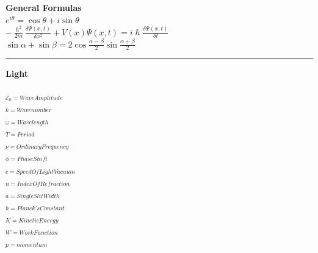 \documentclass[0pt]{report}
\begin{document}
\setlength{\multicolsep}{1pt plus 0.5pt minus 0.5pt}
\begin{multicols}{3}
\begin{flushleft}
\setlength{\abovedisplayskip}{1pt}
\setlength{\belowdisplayskip}{1pt}
\setlength{\abovedisplayshortskip}{1pt}
\setlength{\belowdisplayshortskip}{1pt}
\textbf{General Formulas}\\


$e^{i\theta}=\cos\theta+i\sin\theta$\\
$-\frac{\hslash^2}{2m}\frac{\delta\Psi(x,t)}{\delta x^2}+V(x)\Psi(x,t)=i\hslash\frac{\delta\Psi(x,t)}{\delta t}$\\
$\sin\alpha+\sin\beta=2\cos\frac{\alpha-\beta}{2}\sin\frac{\alpha+\beta}{2}$\\
\noindent\rule[0.5ex]{\linewidth}{1pt}
\textbf{Light}\\

\begin{multicols}{2}
$_{\mathcal{E}_0=WaveAmplitude}$\\
$_{k=Wavenumber}$\\
$_{\omega=Wavelength}$\\
$_{T=Period}$\\
$_{\nu=OrdinaryFrequency}$\\
$_{\phi=PhaseShift}$\\
$_{c=SpeedOfLightVacuum}$\\
$_{n=IndexOfRefraction}$\\
$_{a=SingleSlitWidth}$\\
$_{h=Planck'sConstant}$\\
$_{K=KineticEnergy}$\\
$_{W=WorkFunction}$\\
$_{p=momentum}$\\
\end{multicols}


\end{flushleft}
\end{multicols}
\end{document}
